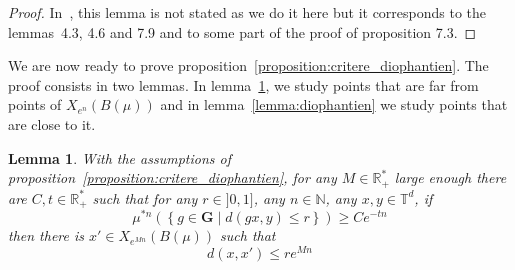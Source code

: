 \documentclass[11pt]{amsart}
\newtheorem{lemma}[theorem]{Lemma}
\theoremstyle{definition}
\theoremstyle{remark}
\numberwithin{equation}{section}
\begin{document}
\begin{proof}
In~\cite{BFLM11}, this lemma is not stated as we do it here but it corresponds to the lemmas~4.3, 4.6 and 7.9 and to some part of the proof of proposition 7.3.
\end{proof}

We are now ready to prove proposition~\ref{proposition:critere_diophantien}. The proof consists in two lemmas. In lemma~\ref{lemma:approx}, we study points that are far from points of $X_{e^n}(B(\mu))$ and in lemma~\ref{lemma:diophantien} we study points that are close to it.

\begin{lemma}\label{lemma:approx}
With the assumptions of proposition~\ref{proposition:critere_diophantien}, for any $M\in {\mathbb R}_+^\ast$ large enough there are $C,t\in {\mathbb R}_+^\ast$ such that for any $r\in ]0,1]$, any $n\in {\mathbb N}$, any $x,y\in {\mathbb T}^d$, if
\[
\mu^{\ast n}\left(\left\{g\in {\mathbf G} \middle| d(gx,y)\leqslant r\right\}\right) \geqslant Ce^{-tn}
\]
then there is $x'\in X_{e^{Mn}}(B(\mu))$ such that
\[
d(x,x') \leqslant re^{Mn}
\]
\end{lemma}
\end{document}
